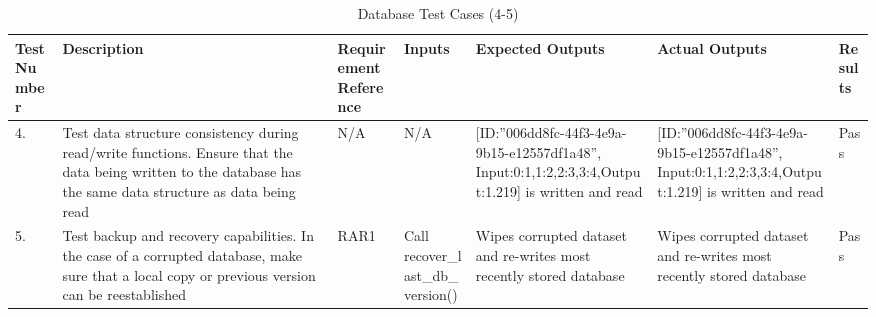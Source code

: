 \documentclass[12pt, titlepage]{article}
\begin{document}
\begin{center}
    \begin{table}[H]
        \centering
        \begin{tabular}{|p{1cm}|p{2.2cm}|p{2.5cm}|p{2.7cm}|p{2.4cm}|p{2.4cm}|p{1.3cm}|}
        \hline
        \bf Test Number & \bf Description & \bf Requirement Reference & \bf Inputs & \bf Expected Outputs & \bf Actual Outputs & \bf Results \\
        \hline
        4. & Test data structure consistency during read/write functions. Ensure that the data being written to the database has the same data structure as data being read & N/A & N/A & [ID:”006dd8fc-44f3-4e9a-9b15-e12557df1a48”, Input:{0:1,1:2,2:3\newline,3:4},\newline Output:1.219\newline222] is written and read & [ID:”006dd8fc-44f3-4e9a-9b15-e12557df1a48”, Input:{0:1,1:2,2:3\newline,3:4},\newline Output:1.219\newline222] is written and read & Pass\\
        \hline
        5. & Test backup and recovery capabilities. In the case of a corrupted database, make sure that a local copy or previous version can be reestablished & RAR1 & Call recover\_last\_\newline db\_version() & Wipes corrupted dataset and re-writes most recently stored database & Wipes corrupted dataset and re-writes most recently stored database & Pass\\
        \hline
        \end{tabular}
        \caption{Database Test Cases (4-5)}
        \label{tab:my_label13}
    \end{table}
\end{center}
\end{document}

